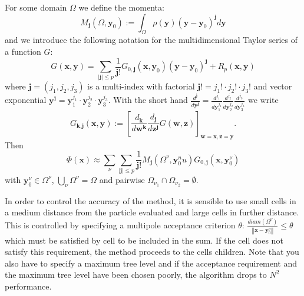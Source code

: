 For some domain $\Omega$ we define the momenta:
\begin{equation*}
M_\textbf{j}(\Omega, \textbf{y}_0) := \int_\Omega \rho(\textbf{y})(\textbf{y}-\textbf{y}_0)^\textbf{j} d\textbf{y}
\end{equation*}
and we introduce the following notation for the multidimensional Taylor series of a function $G$:
\begin{equation*}
G(\textbf{x}, \textbf{y}) = \sum_{\left\vert\textbf{j}\right\vert\leq p} \frac{1}{\textbf{j}!} G_{0, \textbf{j}}(\textbf{x}, \textbf{y}_0)(\textbf{y}-\textbf{y}_0)^{\textbf{j}}+R_p(\textbf{x}, \textbf{y})
\end{equation*}
where $\textbf{j}=(j_1, j_2, j_3)$ is a multi-index with factorial $\textbf{j}!=j_1!\cdot j_2!\cdot j_3!$ 
and vector exponential $\textbf{y}^{\textbf{j}}=\textbf{y}_1^{j_1}\cdot \textbf{y}_2^{j_2}\cdot \textbf{y}_3^{j_3}$.
With the short hand $\frac{d^\textbf{j}}{d\textbf{y}^\textbf{j}} = \frac{d^{j_1}}{d\textbf{y}_1^{j_1}} \frac{d^{j_2}}{d\textbf{y}_2^{j_2}} \frac{d^{j_3}}{d\textbf{y}_3^{j_3}}$ we write
\begin{equation*}
G_{\textbf{k},\textbf{j}}(\textbf{x}, \textbf{y}) := \left[ \frac{d_\textbf{k}}{d\textbf{w}^{\textbf{k}}} \frac{d_\textbf{j}}{d\textbf{z}^{\textbf{j}}}  G(\textbf{w}, \textbf{z}) \right]_{\textbf{w}= \textbf{x}, \textbf{z}= \textbf{y}}.
\end{equation*}
Then
\begin{equation*}
\Phi(\textbf{x}) \approx \sum_\nu \sum_{\left\vert\textbf{j}\right\vert\leq p} \frac{1}{\textbf{j}!} M_\textbf{j}(\Omega^\nu, \textbf{y}_0^nu) G_{0, \textbf{j}}(\textbf{x}, \textbf{y}_0^\nu) 
\end{equation*}
with $ \textbf{y}_0^\nu \in \Omega^\nu$, $\bigcup_\nu \Omega^\nu = \Omega$ and pairwise $\Omega_{\nu_1}\cap \Omega_{\nu_2} = \emptyset$.

In order to control the accuracy of the method, it is sensible to use small cells in a medium distance from the particle evaluated and large cells in further distance.
This is controlled by specifying a multipole acceptance criterion $\theta$: 
$\frac{diam(\Omega^\nu)}{\left\Vert \textbf{x}-\textbf{y}_0^\nu\right\Vert} \leq \theta$
which must be satisfied by cell to be included in the sum. If the cell does not satisfy this requirement, the method proceeds to the cells children.
Note that you also have to specify a maximum tree level and if the acceptance requirement and the maximum tree level have been chosen poorly, the
algorithm drops to $N^2$ performance.

